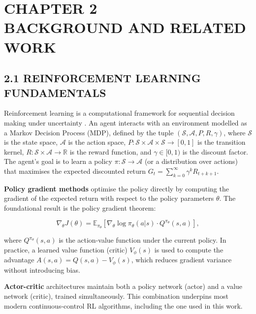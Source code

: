 \documentclass[12pt,a4paper]{article}
\begin{document}
\section*{\centering CHAPTER 2\\[0.3cm] BACKGROUND AND RELATED WORK}
\vspace{2\baselineskip}

\subsection*{2.1 \quad REINFORCEMENT LEARNING FUNDAMENTALS}

\indent Reinforcement learning is a computational framework for sequential decision
making under uncertainty \cite{Sutton2018}. An agent interacts with an
environment modelled as a Markov Decision Process (MDP), defined by the tuple
$(\mathcal{S}, \mathcal{A}, P, R, \gamma)$, where $\mathcal{S}$ is the state
space, $\mathcal{A}$ is the action space, $P: \mathcal{S} \times \mathcal{A}
\times \mathcal{S} \rightarrow [0,1]$ is the transition kernel, $R:
\mathcal{S} \times \mathcal{A} \rightarrow \mathbb{R}$ is the reward function,
and $\gamma \in [0,1)$ is the discount factor. The agent's goal is to learn a
policy $\pi: \mathcal{S} \rightarrow \mathcal{A}$ (or a distribution over
actions) that maximises the expected discounted return $G_t = \sum_{k=0}^{\infty}
\gamma^k R_{t+k+1}$.

\textbf{Policy gradient methods} optimise the policy directly by computing the
gradient of the expected return with respect to the policy parameters
$\theta$. The foundational result is the policy gradient theorem:

\begin{equation}
  \nabla_\theta J(\theta) = \mathbb{E}_{\pi_\theta}
    \left[ \nabla_\theta \log \pi_\theta(a|s) \cdot Q^{\pi_\theta}(s, a) \right],
\end{equation}

\noindent where $Q^{\pi_\theta}(s,a)$ is the action-value function under the
current policy. In practice, a learned value function (critic) $V_\phi(s)$
is used to compute the advantage $A(s,a) = Q(s,a) - V_\phi(s)$, which
reduces gradient variance without introducing bias.

\textbf{Actor-critic} architectures maintain both a policy network (actor) and a
value network (critic), trained simultaneously. This combination underpins
most modern continuous-control RL algorithms, including the one used in this
work.
\end{document}
